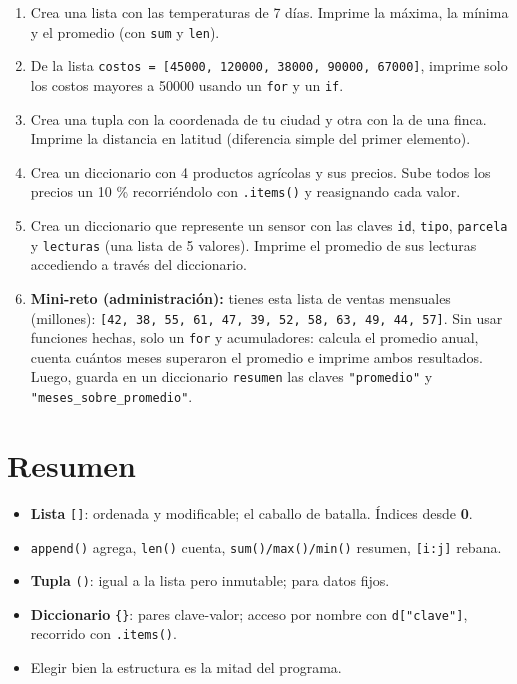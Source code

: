 \documentclass[
  spanish,
  letterpaper,
  DIV=11,
  numbers=noendperiod]{scrreprt}
\providecommand{\tightlist}{%
  \setlength{\itemsep}{0pt}\setlength{\parskip}{0pt}}
\begin{document}
\begin{enumerate}
\def\labelenumi{\arabic{enumi}.}
\tightlist
\item
  Crea una lista con las temperaturas de 7 días. Imprime la máxima, la
  mínima y el promedio (con \texttt{sum} y \texttt{len}).
\item
  De la lista
  \texttt{costos\ =\ {[}45000,\ 120000,\ 38000,\ 90000,\ 67000{]}},
  imprime solo los costos mayores a 50000 usando un \texttt{for} y un
  \texttt{if}.
\item
  Crea una tupla con la coordenada de tu ciudad y otra con la de una
  finca. Imprime la distancia en latitud (diferencia simple del primer
  elemento).
\item
  Crea un diccionario con 4 productos agrícolas y sus precios. Sube
  todos los precios un 10 \% recorriéndolo con \texttt{.items()} y
  reasignando cada valor.
\item
  Crea un diccionario que represente un sensor con las claves
  \texttt{id}, \texttt{tipo}, \texttt{parcela} y \texttt{lecturas} (una
  lista de 5 valores). Imprime el promedio de sus lecturas accediendo a
  través del diccionario.
\item
  \textbf{Mini-reto (administración):} tienes esta lista de ventas
  mensuales (millones):
  \texttt{{[}42,\ 38,\ 55,\ 61,\ 47,\ 39,\ 52,\ 58,\ 63,\ 49,\ 44,\ 57{]}}.
  Sin usar funciones hechas, solo un \texttt{for} y acumuladores:
  calcula el promedio anual, cuenta cuántos meses superaron el promedio
  e imprime ambos resultados. Luego, guarda en un diccionario
  \texttt{resumen} las claves \texttt{"promedio"} y
  \texttt{"meses\_sobre\_promedio"}.
\end{enumerate}

\section{Resumen}\label{resumen-3}

\begin{itemize}
\tightlist
\item
  \textbf{Lista} \texttt{{[}{]}}: ordenada y modificable; el caballo de
  batalla. Índices desde \textbf{0}.
\item
  \texttt{append()} agrega, \texttt{len()} cuenta,
  \texttt{sum()/max()/min()} resumen, \texttt{{[}i:j{]}} rebana.
\item
  \textbf{Tupla} \texttt{()}: igual a la lista pero inmutable; para
  datos fijos.
\item
  \textbf{Diccionario} \texttt{\{\}}: pares clave-valor; acceso por
  nombre con \texttt{d{[}"clave"{]}}, recorrido con \texttt{.items()}.
\item
  Elegir bien la estructura es la mitad del programa.
\end{itemize}
\end{document}
